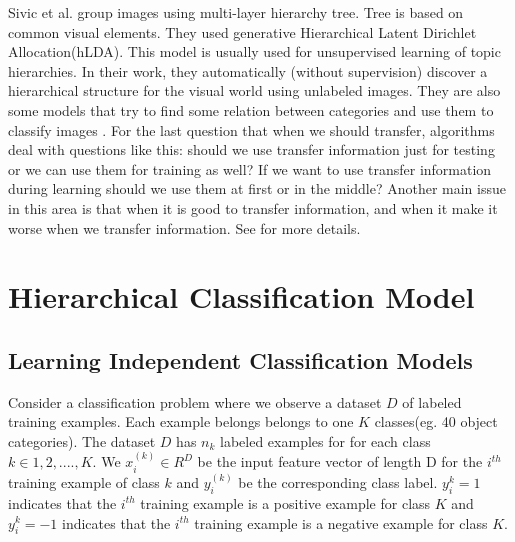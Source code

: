 \documentclass[10pt,twocolumn,letterpaper]{article}
\begin{document}
Sivic et al. \cite{sivic} group images using multi-layer hierarchy tree. Tree
is based on common visual elements. They used generative Hierarchical Latent
Dirichlet Allocation(hLDA)\cite{hlda}. This model is usually used for unsupervised learning of topic
hierarchies. In their work, they automatically (without supervision) discover a
hierarchical structure for the visual world using unlabeled images. They are
also some models that try to find some relation between categories and use them
to classify images \cite{transfer22}.
For the last question that when we should transfer, algorithms deal with questions like this: should we use transfer information just for testing or we can use them for training as well? If we want to use transfer information during learning should we use them at first or in the middle? Another main issue in this area is that when it is good to transfer information, and when it make it worse when we transfer information. See \cite{whentransfer} for more details.



\section{Hierarchical Classification Model}

\subsection{Learning Independent Classification Models}

Consider a classification problem where we observe a dataset $D$ of labeled  training examples. 
Each example belongs belongs to one $K$ classes(eg. 40 object categories). The dataset $D$
has $n_{k}$ labeled examples for for each class $k  \in {1,2,....,K} $. We $x_{i}^{(k)} \in R^{D} $ 
be the input feature vector of length D for the $i^{th}$ training example of class $k$ and 
$y_{i}^{(k)}$ be the corresponding class label. $ y_{i}^{k} = 1 $ indicates that the $i^{th}$ training example 
is a positive example for class $K$ and  $ y_{i}^{k} = -1 $ indicates that the $i^{th}$ training example 
is a negative example for class $K$.
\end{document}
